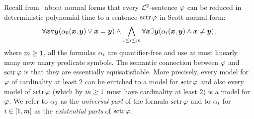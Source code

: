 Recall from~ about normal forms that every $\mathcal{L}^{2}$-sentence
$\varphi$ can be reduced in deterministic polynomial time to a sentence
$\operatorname{sctr}\varphi$ in Scott normal form:
\[
  \forall\bm{x}\forall\bm{y} (\alpha_{0}(\bm{x},\bm{y}) \lor \bm{x} = \bm{y}) \land
  \bigwedge_{1 \leq i \leq m} \forall\bm{x}\exists\bm{y}(
  \alpha_{i}(\bm{x},\bm{y}) \land \bm{x} \neq \bm{y}),
\]
where $m \geq 1$, all the formulas $\alpha_{i}$ are quantifier-free and use at
most linearly many new unary predicate symbols.
The semantic connection between $\varphi$ and $\operatorname{sctr}\varphi$ is that they are
essentially equisatisfiable. More precisely, every model for $\varphi$ of
cardinality at least $2$ can be enriched to a model for $\operatorname{sctr}\varphi$ and also
every model of $\operatorname{sctr}\varphi$ (which by $m \geq 1$ must have cardinality at
least $2$) is a model for $\varphi$.
We refer to $\alpha_{0}$ as the \emph{universal part} of the formula $\operatorname{sctr}\varphi$
and to $\alpha_{i}$ for $i\in[1,m]$ as the \emph{existential parts} of
$\operatorname{sctr}\varphi$.

